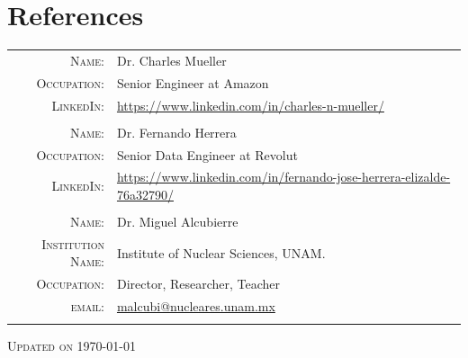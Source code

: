 \documentclass[a4paper,10pt]{article} %
\begin{document}
\section{References}
\bigskip
\begin{tabular}{rl}
	\textsc{Name:} & Dr. Charles Mueller\\
	\textsc{Occupation:} & Senior Engineer at Amazon\\
	\textsc{LinkedIn:} & \href{https://www.linkedin.com/in/charles-n-mueller/}{https://www.linkedin.com/in/charles-n-mueller/}\\
	\multicolumn{2}{c}{} \\
	\textsc{Name:} & Dr. Fernando Herrera \\
	\textsc{Occupation:} & Senior Data Engineer at Revolut\\
	\textsc{LinkedIn:} & \href{https://www.linkedin.com/in/fernando-jose-herrera-elizalde-76a32790/}{https://www.linkedin.com/in/fernando-jose-herrera-elizalde-76a32790/}\\
	\multicolumn{2}{c}{} \\
	\textsc{Name:} & Dr. Miguel Alcubierre \\
	\textsc{Institution Name:} & Institute of Nuclear Sciences, UNAM.\\
	\textsc{Occupation:} & Director, Researcher, Teacher\\
	\textsc{email:} & \href{mailto:malcubi@nucleares.unam.mx}{malcubi@nucleares.unam.mx}\\
	\multicolumn{2}{c}{} \\
\end{tabular}
\vspace{0cm}
\begin{center}
	\textsc{Updated on \today}
\end{center}
\end{document}

